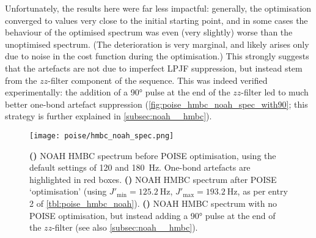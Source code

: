 Unfortunately, the results here were far less impactful: generally, the optimisation converged to values very close to the initial starting point, and in some cases the behaviour of the optimised spectrum was even (very slightly) worse than the unoptimised spectrum.
(The deterioration is very marginal, and likely arises only due to noise in the cost function during the optimisation.)
This strongly suggests that the artefacts are not due to imperfect LPJF suppression, but instead stem from the $zz$-filter component of the sequence.
This was indeed verified experimentally: the addition of a \carbon{} \ang{90} pulse at the end of the $zz$-filter led to much better one-bond artefact suppression (\cref{fig:poise_hmbc_noah_spec_with90}; this strategy is further explained in \cref{subsec:noah__hmbc}).

\begin{figure}[htb]
    \centering
    \texttt{[image: poise/hmbc\_noah\_spec.png]}%
    {\label{fig:poise_hmbc_noah_spec_unopt}}%
    {\label{fig:poise_hmbc_noah_spec_opt}}%
    {\label{fig:poise_hmbc_noah_spec_with90}}%
    \caption[NOAH HMBC spectra before and after optimisation]{
        \textbf{()} NOAH HMBC spectrum before POISE optimisation, using the default settings of 120 and \qty{180}{\Hz}.
        One-bond artefacts are highlighted in red boxes.
        \textbf{()} NOAH HMBC spectrum after POISE `optimisation' (using $J'_\text{min} = \qty{125.2}{\Hz}$, $J'_\text{max} = \qty{193.2}{\Hz}$, as per entry 2 of \cref{tbl:poise_hmbc_noah}).
        \textbf{()} NOAH HMBC spectrum with no POISE optimisation, but instead adding a \ang{90} \carbon{} pulse at the end of the $zz$-filter (see also \cref{subsec:noah__hmbc}).
    }
    \label{fig:poise_hmbc_noah_spec}
\end{figure}
